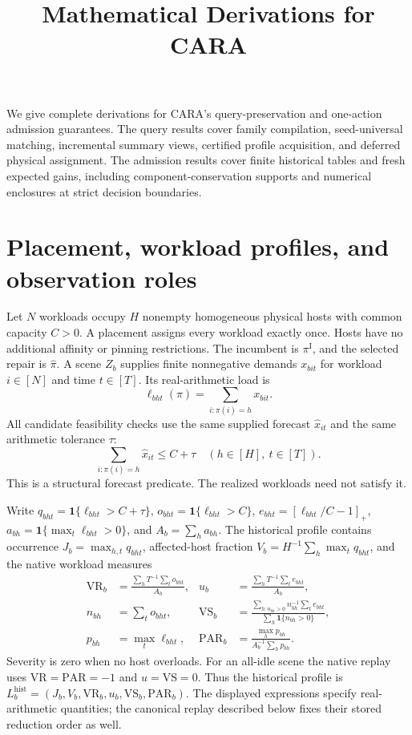 \documentclass[11pt]{article}
\title{Mathematical Derivations for CARA}
\author{}
\date{}
\newcommand{\inc}{\pi^{\mathrm I}}
\newcommand{\act}{\widehat\pi}
\begin{document}
\maketitle
We give complete derivations for CARA's query-preservation and one-action admission guarantees. The query results cover family compilation, seed-universal matching, incremental summary views, certified profile acquisition, and deferred physical assignment. The admission results cover finite historical tables and fresh expected gains, including component-conservation supports and numerical enclosures at strict decision boundaries.

\section{Placement, workload profiles, and observation roles}
Let $N$ workloads occupy $H$ nonempty homogeneous physical hosts with common capacity $C>0$. A placement assigns every workload exactly once. Hosts have no additional affinity or pinning restrictions. The incumbent is $\inc$, and the selected repair is $\act$. A scene $Z_b$ supplies finite nonnegative demands $x_{bit}$ for workload $i\in[N]$ and time $t\in[T]$. Its real-arithmetic load is
\begin{equation}
 \ell_{bht}(\pi)=\sum_{i:\pi(i)=h}x_{bit}.
\end{equation}
All candidate feasibility checks use the same supplied forecast $\widehat x_{it}$ and the same arithmetic tolerance $\tau$:
\begin{equation}
 \sum_{i:\pi(i)=h}\widehat x_{it}\le C+\tau\quad(h\in[H],\ t\in[T]).
\end{equation}
This is a structural forecast predicate. The realized workloads need not satisfy it.

Write $q_{bht}=\mathbf1\{\ell_{bht}>C+\tau\}$, $o_{bht}=\mathbf1\{\ell_{bht}>C\}$, $e_{bht}=[\ell_{bht}/C-1]_+$, $a_{bh}=\mathbf1\{\max_t\ell_{bht}>0\}$, and $A_b=\sum_ha_{bh}$. The historical profile contains occurrence $J_b=\max_{h,t}q_{bht}$, affected-host fraction $V_b=H^{-1}\sum_h\max_tq_{bht}$, and the native workload measures
\begin{align}
 \mathrm{VR}_b&=\frac{\sum_h T^{-1}\sum_t o_{bht}}{A_b},&
 u_b&=\frac{\sum_h T^{-1}\sum_t e_{bht}}{A_b},\\
 n_{bh}&=\sum_t o_{bht},&
 \mathrm{VS}_b&=\frac{\sum_{h:n_{bh}>0}n_{bh}^{-1}\sum_te_{bht}}{\sum_h\mathbf1\{n_{bh}>0\}},\\
 p_{bh}&=\max_t\ell_{bht},&
 \mathrm{PAR}_b&=\frac{\max_hp_{bh}}{A_b^{-1}\sum_hp_{bh}}.
\end{align}
Severity is zero when no host overloads. For an all-idle scene the native replay uses $\mathrm{VR}=\mathrm{PAR}=-1$ and $u=\mathrm{VS}=0$. Thus the historical profile is $L_b^{\mathrm{hist}}=(J_b,V_b,\mathrm{VR}_b,u_b,\mathrm{VS}_b,\mathrm{PAR}_b)$. The displayed expressions specify real-arithmetic quantities; the canonical replay described below fixes their stored reduction order as well.
\end{document}
